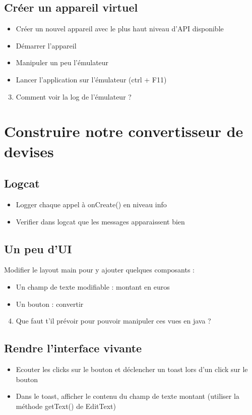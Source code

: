 \documentclass{article}
\begin{document}
\subsection{Créer un appareil virtuel}
\begin{itemize}
\item Créer un nouvel appareil avec le plus haut niveau d'API disponible
\item Démarrer l'appareil
\item Manipuler un peu l'émulateur
\item Lancer l'application sur l'émulateur (ctrl + F11)
\end{itemize}
\begin{enumerate}
 \setcounter{enumi}{2}
\item Comment voir la log de l'émulateur ?
\end{enumerate}
\section{Construire notre convertisseur de devises}
\subsection{Logcat}
\begin{itemize}
\item Logger chaque appel à onCreate() en niveau info
\item Verifier dans logcat que les messages apparaissent bien
\end{itemize}
\subsection{Un peu d'UI}
Modifier le layout main pour y ajouter quelques composants :
\begin{itemize}
\item Un champ de texte modifiable : montant en euros
\item Un bouton : convertir
\end{itemize}
\begin{enumerate}
 \setcounter{enumi}{3}
\item Que faut t'il prévoir pour pouvoir manipuler ces vues en java ?
\end{enumerate}
\subsection{Rendre l'interface vivante}
\begin{itemize}
\item Ecouter les clicks sur le bouton et déclencher un toast lors d'un click sur le bouton
\item Dans le toast, afficher le contenu du champ de texte montant (utiliser la
méthode getText() de EditText)
\end{itemize}
\end{document}
